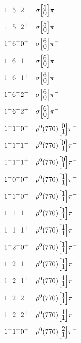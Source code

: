 \documentclass[10pt,a4paper]{article}
\def\dst{\displaystyle}
\def\vsp{\hbox{\vrule height12.5pt depth3.5pt width0pt}}
\def\ells#1#2{\Big[\hskip-5pt\vsp\begin{array}{c}\dst#1\\[-4pt]\dst#2\end{array}\vsp\hskip-5pt\Big]}
\begin{document}
\begin{align*} 
 \begin{aligned}
1^{-}5^{+}2^{-}\quad & \sigma\ells{5}{0}\pi^-\\
1^{-}5^{+}2^{+}\quad & \sigma\ells{5}{0}\pi^-\\
1^{-}6^{-}0^{+}\quad & \sigma\ells{6}{0}\pi^-\\
1^{-}6^{-}1^{-}\quad & \sigma\ells{6}{0}\pi^-\\
1^{-}6^{-}1^{+}\quad & \sigma\ells{6}{0}\pi^-\\
1^{-}6^{-}2^{-}\quad & \sigma\ells{6}{0}\pi^-\\
1^{-}6^{-}2^{+}\quad & \sigma\ells{6}{0}\pi^-\\
1^{-}1^{+}0^{+}\quad & \rho^0(770)\ells{0}{1}\pi^-\\
1^{-}1^{+}1^{-}\quad & \rho^0(770)\ells{0}{1}\pi^-\\
1^{-}1^{+}1^{+}\quad & \rho^0(770)\ells{0}{1}\pi^-\\
1^{-}0^{-}0^{+}\quad & \rho^0(770)\ells{1}{1}\pi^-\\
1^{-}1^{-}0^{-}\quad & \rho^0(770)\ells{1}{1}\pi^-\\
1^{-}1^{-}1^{-}\quad & \rho^0(770)\ells{1}{1}\pi^-\\
1^{-}1^{-}1^{+}\quad & \rho^0(770)\ells{1}{1}\pi^-\\
1^{-}2^{-}0^{+}\quad & \rho^0(770)\ells{1}{1}\pi^-\\
1^{-}2^{-}1^{-}\quad & \rho^0(770)\ells{1}{1}\pi^-\\
1^{-}2^{-}1^{+}\quad & \rho^0(770)\ells{1}{1}\pi^-\\
1^{-}2^{-}2^{-}\quad & \rho^0(770)\ells{1}{1}\pi^-\\
1^{-}2^{-}2^{+}\quad & \rho^0(770)\ells{1}{1}\pi^-\\
1^{-}1^{+}0^{+}\quad & \rho^0(770)\ells{2}{1}\pi^-\\
\end{aligned} 
 \end{align*}\pagebreak
\end{document}
